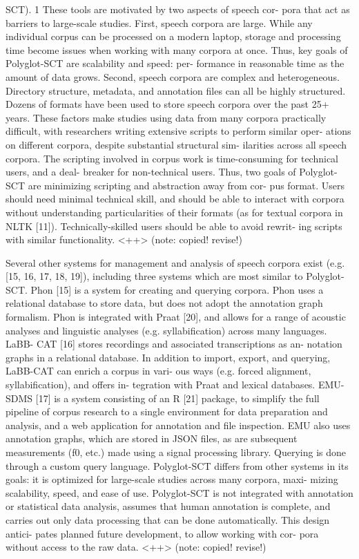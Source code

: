 \documentclass[twoside,11pt]{article}
\begin{document}
SCT). 1 These tools are motivated by two aspects of speech cor-
pora that act as barriers to large-scale studies.
First, speech corpora are large. While any individual corpus
can be processed on a modern laptop, storage and processing
time become issues when working with many corpora at once.
Thus, key goals of Polyglot-SCT are scalability and speed: per-
formance in reasonable time as the amount of data grows.
Second, speech corpora are complex and heterogeneous.
Directory structure, metadata, and annotation files can all be
highly structured. Dozens of formats have been used to store
speech corpora over the past 25+ years. These factors make
studies using data from many corpora practically difficult, with
researchers writing extensive scripts to perform similar oper-
ations on different corpora, despite substantial structural sim-
ilarities across all speech corpora. The scripting involved in
corpus work is time-consuming for technical users, and a deal-
breaker for non-technical users. Thus, two goals of Polyglot-
SCT are minimizing scripting and abstraction away from cor-
pus format. Users should need minimal technical skill, and
should be able to interact with corpora without understanding
particularities of their formats (as for textual corpora in NLTK
[11]). Technically-skilled users should be able to avoid rewrit-
ing scripts with similar functionality.
<++> (note: copied! revise!)

Several other systems for management and analysis of speech
corpora exist (e.g. [15, 16, 17, 18, 19]), including three systems
which are most similar to Polyglot-SCT.
Phon [15] is a system for creating and querying corpora.
Phon uses a relational database to store data, but does not adopt
the annotation graph formalism. Phon is integrated with Praat
[20], and allows for a range of acoustic analyses and linguistic
analyses (e.g. syllabification) across many languages. LaBB-
CAT [16] stores recordings and associated transcriptions as an-
notation graphs in a relational database. In addition to import,
export, and querying, LaBB-CAT can enrich a corpus in vari-
ous ways (e.g. forced alignment, syllabification), and offers in-
tegration with Praat and lexical databases. EMU-SDMS [17]
is a system consisting of an R [21] package, to simplify the
full pipeline of corpus research to a single environment for data
preparation and analysis, and a web application for annotation
and file inspection. EMU also uses annotation graphs, which
are stored in JSON files, as are subsequent measurements (f0,
etc.) made using a signal processing library. Querying is done
through a custom query language.
Polyglot-SCT differs from other systems in its goals: it is
optimized for large-scale studies across many corpora, maxi-
mizing scalability, speed, and ease of use. Polyglot-SCT is not
integrated with annotation or statistical data analysis, assumes
that human annotation is complete, and carries out only data
processing that can be done automatically. This design antici-
pates planned future development, to allow working with cor-
pora without access to the raw data.
<++> (note: copied! revise!)
\end{document}
